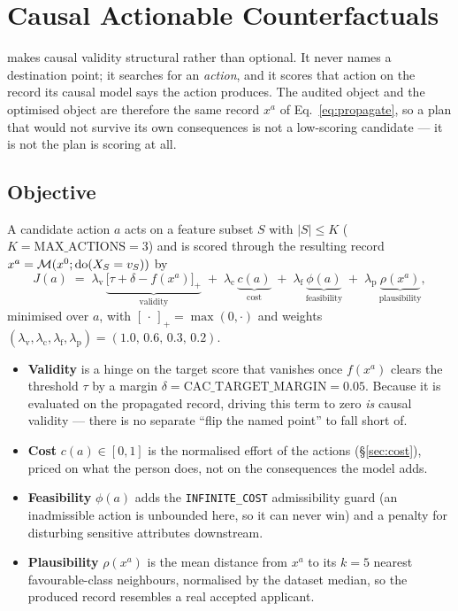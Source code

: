 \section{Causal Actionable Counterfactuals}
\label{sec:method}

\cac{} makes causal validity structural rather than optional. It never names a
destination point; it searches for an \emph{action}, and it scores that action on
the record its causal model says the action produces. The audited object and the
optimised object are therefore the same record $x^{a}$ of
Eq.~\eqref{eq:propagate}, so a plan that would not survive its own consequences is
not a low-scoring candidate --- it is not the plan \cac{} is scoring at all.

\subsection{Objective}
A candidate action $a$ acts on a feature subset $S$ with $|S|\le K$
($K=\text{MAX\_ACTIONS}=3$) and is scored through the resulting record
$x^{a}=\mathcal{M}(x^{0};\mathrm{do}(X_S=v_S))$ by
\begin{equation}
  J(a) \;=\; \lambda_{\text{v}}\,\underbrace{\big[\tau+\delta-f(x^{a})\big]_{+}}_{\text{validity}}
        \;+\; \lambda_{\text{c}}\,\underbrace{c(a)}_{\text{cost}}
        \;+\; \lambda_{\text{f}}\,\underbrace{\phi(a)}_{\text{feasibility}}
        \;+\; \lambda_{\text{p}}\,\underbrace{\rho(x^{a})}_{\text{plausibility}},
  \label{eq:objective}
\end{equation}
minimised over $a$, with $[\,\cdot\,]_{+}=\max(0,\cdot)$ and weights
$(\lambda_{\text{v}},\lambda_{\text{c}},\lambda_{\text{f}},\lambda_{\text{p}})
=(1.0,\,0.6,\,0.3,\,0.2)$.
\begin{itemize}
  \item \textbf{Validity} is a hinge on the target score that vanishes once
    $f(x^{a})$ clears the threshold $\tau$ by a margin
    $\delta=\text{CAC\_TARGET\_MARGIN}=0.05$. Because it is evaluated on the
    propagated record, driving this term to zero \emph{is} causal validity ---
    there is no separate ``flip the named point'' to fall short of.
  \item \textbf{Cost} $c(a)\in[0,1]$ is the normalised effort of the actions
    (\S\ref{sec:cost}), priced on what the person does, not on the consequences
    the model adds.
  \item \textbf{Feasibility} $\phi(a)$ adds the \texttt{INFINITE\_COST}
    admissibility guard (an inadmissible action is unbounded here, so it can never
    win) and a penalty for disturbing sensitive attributes downstream.
  \item \textbf{Plausibility} $\rho(x^{a})$ is the mean distance from $x^{a}$ to
    its $k{=}5$ nearest favourable-class neighbours, normalised by the dataset
    median, so the produced record resembles a real accepted applicant.
\end{itemize}

